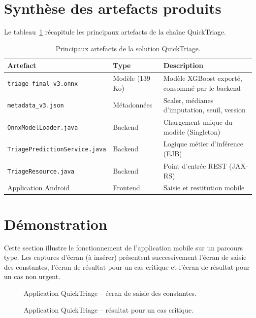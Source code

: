 \section{Synthèse des artefacts produits}
Le tableau~\ref{tab:artefacts} récapitule les principaux artefacts de la chaîne QuickTriage.

\begin{table}[h]
\centering
\renewcommand{\arraystretch}{1.35}
\begin{tabular}{p{4.5cm} p{3cm} p{6cm}}
\toprule
\textbf{Artefact} & \textbf{Type} & \textbf{Description} \\
\midrule
\texttt{triage\_final\_v3.onnx} & Modèle (139 Ko) & Modèle XGBoost exporté, consommé par le backend \\
\texttt{metadata\_v3.json} & Métadonnées & Scaler, médianes d'imputation, seuil, version \\
\texttt{OnnxModelLoader.java} & Backend & Chargement unique du modèle (Singleton) \\
\texttt{TriagePredictionService.java} & Backend & Logique métier d'inférence (EJB) \\
\texttt{TriageResource.java} & Backend & Point d'entrée REST (JAX-RS) \\
Application Android & Frontend & Saisie et restitution mobile \\
\bottomrule
\end{tabular}
\caption{Principaux artefacts de la solution QuickTriage.}
\label{tab:artefacts}
\end{table}

\section{Démonstration}
Cette section illustre le fonctionnement de l'application mobile sur un parcours type. Les captures
d'écran (à insérer) présentent successivement l'écran de saisie des constantes, l'écran de
résultat pour un cas critique et l'écran de résultat pour un cas non urgent.

\begin{figure}[h]
\centering
\caption{Application QuickTriage -- écran de saisie des constantes.}
\label{fig:demo-saisie}
\end{figure}

\begin{figure}[h]
\centering
\caption{Application QuickTriage -- résultat pour un cas critique.}
\label{fig:demo-critique}
\end{figure}

